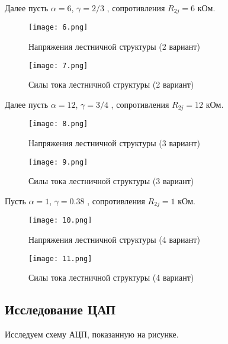 \documentclass[a4paper, 12pt]{article}%
\begin{document}
Далее пусть $\alpha = 6$, $\gamma = 2/3$ , сопротивления $R_{2j} = 6$ кОм.

\begin{figure}[h!]
    \centering
    \texttt{[image: 6.png]}
    \caption{Напряжения лестничной структуры (2 вариант)}
    \label{fig:vac}
\end{figure}

\begin{figure}[h!]
    \centering
    \texttt{[image: 7.png]}
    \caption{Силы тока лестничной структуры (2 вариант)}
    \label{fig:vac}
\end{figure}

Далее пусть $\alpha = 12$, $\gamma = 3/4$ , сопротивления $R_{2j} = 12$ кОм.

\begin{figure}[h!]
    \centering
    \texttt{[image: 8.png]}
    \caption{Напряжения лестничной структуры (3 вариант)}
    \label{fig:vac}
\end{figure}

\begin{figure}[h!]
    \centering
    \texttt{[image: 9.png]}
    \caption{Силы тока лестничной структуры (3 вариант)}
    \label{fig:vac}
\end{figure}

Пусть $\alpha = 1$, $\gamma = 0.38$ , сопротивления $R_{2j} = 1$ кОм.

\begin{figure}[h!]
    \centering
    \texttt{[image: 10.png]}
    \caption{Напряжения лестничной структуры (4 вариант)}
    \label{fig:vac}
\end{figure}

\begin{figure}[h!]
    \centering
    \texttt{[image: 11.png]}
    \caption{Силы тока лестничной структуры (4 вариант)}
    \label{fig:vac}
\end{figure}


\subsection{Исследование ЦАП}

Исследуем схему АЦП, показанную на рисунке.

\newpage
\end{document}

